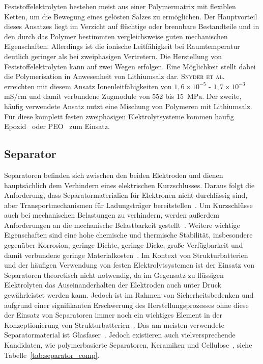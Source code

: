 Feststoffelektrolyten bestehen meist aus einer Polymermatrix mit flexiblen Ketten, um die Bewegung eines gelösten Salzes zu ermöglichen. Der Hauptvorteil dieses Ansatzes liegt im Verzicht auf flüchtige oder brennbare Bestandteile und in den durch das Polymer bestimmten vergleichsweise guten mechanischen Eigenschaften. Allerdings ist die ionische Leitfähigkeit bei Raumtemperatur deutlich geringer als bei zweiphasigen Vertretern. Die Herstellung von Feststoffelektrolyten kann auf zwei Wegen erfolgen. Eine Möglichkeit stellt dabei die Polymerisation in Anwesenheit von Lithiumsalz dar. \textsc{Snyder et al.}~\cite{Snyder2007, Snyder2009} erreichten mit diesem Ansatz Ionenleitfähigkeiten von $1,6 \times 10^{-5}$ - $1,7 \times 10^{-3}$ $\si{\milli \siemens \per \cm}$ und damit verbundene Zugmodule von 552 bis 15~$\si{\MPa}$. Der zweite, häufig verwendete Ansatz nutzt eine Mischung von Polymeren mit Lithiumsalz. Für diese komplett festen zweiphasigen Elektrolytsysteme kommen häufig Epoxid~\cite{Matsumoto2011,Munoz2021,Wang2020b} oder PEO~\cite{Moreno2011,Ji2010,Guo2021} zum Einsatz.

\subsection{Separator}

Separatoren befinden sich zwischen den beiden Elektroden und dienen hauptsächlich dem Verhindern eines elektrischen Kurzschlusses. Daraus folgt die Anforderung, dass Separatormaterialien für Elektronen nicht durchlässig sind, aber Transportmechanismen für Ladungsträger bereitstellen~\cite{Kurzweil2015}. Um Kurzschlüsse auch bei mechanischen Belastungen zu verhindern, werden außerdem Anforderungen an die mechanische Belastbarkeit gestellt~\cite{Asp2015}. Weitere wichtige Eigenschaften sind eine hohe chemische und thermische Stabilität, insbesondere gegenüber Korrosion, geringe Dichte, geringe Dicke, große Verfügbarkeit und damit verbundene geringe Materialkosten~\cite{Beard2019}. Im Kontext von Strukturbatterien und der häufigen Verwendung von festen Elektrolytsystemen ist der Einsatz von Separatoren theoretisch nicht notwendig, da im Gegensatz zu flüssigen Elektrolyten das Auseinanderhalten der Elektroden auch unter Druck gewährleistet werden kann. Jedoch ist im Rahmen von Sicherheitsbedenken und aufgrund einer signifikanten Erschwerung des Herstellungsprozesses ohne diese der Einsatz von Separatoren immer noch ein wichtiges Element in der Konzeptionierung von Strukturbatterien~\cite{Asp2015, Hubert2022}. Das am meisten verwendete Separatormaterial ist Glasfaser~\cite{Zhou2022}. Jedoch existieren auch vielversprechende Kandidaten, wie polymerbasierte Separatoren, Keramiken und Cellulose~\cite{Simon2008, Greenhalgh2023}, siehe Tabelle~\ref{tab:separator_comp}.

